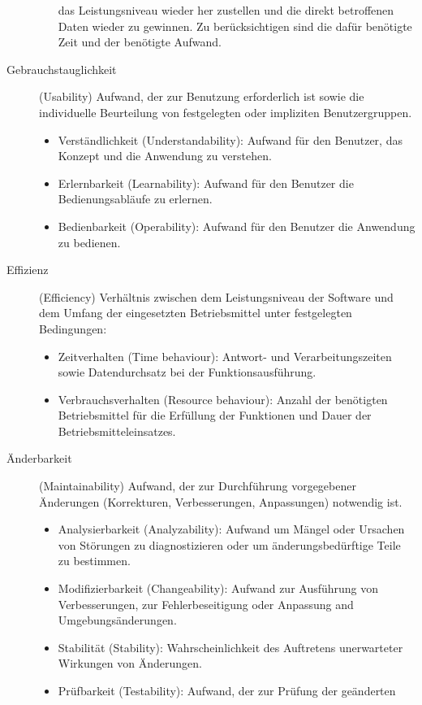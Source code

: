 \begin{description}
\begin{itemize}
  das Leistungs\-ni\-veau wieder her zustellen und die direkt betroffenen Daten
  wieder zu gewinnen. Zu be\-rück\-sich\-tigen sind die dafür benötigte Zeit und der
  benötigte Aufwand.
  \end{itemize}
\ifslides
\newpage
\fi
\item[Gebrauchstauglichkeit] (Usability) Aufwand, der zur Benutzung
  erforderlich ist sowie die individuelle Beurteilung von festgelegten oder
  impliziten Benutzergruppen.
  \begin{itemize}
  \item Verständlichkeit (Understandability): Aufwand für den Benutzer, das
  Konzept und die Anwendung zu verstehen.
\item Erlernbarkeit (Learnability): Aufwand für den Benutzer
  die Bedienungsabläufe zu erlernen.
\item Bedienbarkeit (Operability): Aufwand für den Benutzer die Anwendung zu
  bedienen.
  \end{itemize}
\ifslides
\newpage
\fi
\item[Effizienz] (Efficiency) Verhältnis zwischen dem Leistungsniveau der
  Software und dem Umfang der eingesetzten Betriebsmittel unter festgelegten
  Bedingungen:
  \begin{itemize}
  \item Zeitverhalten (Time behaviour): Antwort- und Verarbeitungszeiten sowie
  Datendurchsatz bei der Funktionsausführung.
\item Verbrauchsverhalten (Resource behaviour): Anzahl der benötigten
  Betriebsmittel für die Erfüllung der Funktionen und Dauer der
  Betriebsmitteleinsatzes.
  \end{itemize}
\ifslides
\newpage
\fi
\item[Änderbarkeit] (Maintainability) Aufwand, der zur Durchführung
  vorgegebener Änderungen (Korrekturen, Verbesserungen, Anpassungen) notwendig
  ist.
  \begin{itemize}
  \item Analysierbarkeit (Analyzability): Aufwand um Mängel oder Ursachen von
  Stör\-un\-gen zu diagnostizieren oder um änderungsbedürftige Teile zu
  bestimmen.
\item Modifizierbarkeit (Changeability): Aufwand zur Ausführung von
  Verbesserungen, zur Fehlerbeseitigung oder Anpassung and
  Umgebungsänderungen.
\item Stabilität (Stability): Wahrscheinlichkeit des Auftretens unerwarteter
  Wirkungen von Änderungen.
\item Prüfbarkeit (Testability): Aufwand, der zur Prüfung der geänderten

\end{itemize}
\end{description}
